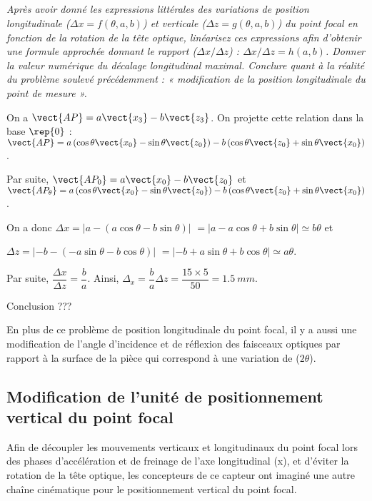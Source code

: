 \subparagraph{\label{q_15}}\textit{
Après avoir donné les expressions littérales des variations de position longitudinale ($\Delta x = f(\theta, a, b)$)
et verticale ($\Delta z = g(\theta, a, b)$) du point focal en fonction de la rotation de la tête optique, linéarisez ces
expressions afin d’obtenir une formule approchée donnant le rapport ($\Delta x / \Delta z$) : $\Delta x / \Delta z = h(a, b)$.
Donner la valeur numérique du décalage longitudinal maximal.
Conclure quant à la réalité du problème soulevé précédemment : « modification de la position
longitudinale du point de mesure ».}
\ifprof
\begin{corrige}
On a $\vect{AP} = a\vect{x_3}-b\vect{z_3}$. On projette cette relation dans la base $\rep{0}$ : 
 $\vect{AP} = a\left(\cos\theta \vect{x_0} - \sin\theta \vect{z_0}  \right) -b\left(\cos\theta \vect{z_0} + \sin\theta \vect{x_0}  \right)$.
 
 Par suite, 
 $\vect{AP_0} = a\vect{x_0}  -b\vect{z_0} $ et 
  $\vect{AP_{\theta}} = a\left(\cos\theta \vect{x_0} - \sin\theta \vect{z_0}  \right) -b\left(\cos\theta \vect{z_0} + \sin\theta \vect{x_0}  \right)$.

On a donc 
$\Delta x =  \left| a - \left(a\cos\theta   -b \sin\theta \right)\right|$ $=  \left| a - a\cos\theta +b \sin\theta \right| \simeq b\theta$ et

$\Delta z =  \left| -b - \left(-a\sin\theta -b\cos\theta \right)\right|$ $=  \left| -b +a\sin\theta +b\cos\theta \right|\simeq a\theta$.

Par suite, $\dfrac{\Delta x}{\Delta z} = \dfrac{b}{a}$. Ainsi, $\Delta_x = \dfrac{b}{a} \Delta z = \dfrac{15\times 5}{50}=\SI{1,5}{mm}$.

Conclusion ???
\end{corrige}
\else
\fi

\ifprof
\else
En plus de ce problème de position longitudinale du point focal, il y a aussi une modification de l’angle
d’incidence et de réflexion des faisceaux optiques par rapport à la surface de la pièce qui correspond à une
variation de ($2\theta$).
\fi

\subsection{Modification de l'unité de positionnement vertical du point focal}

\ifprof
\else
Afin de découpler les mouvements verticaux et longitudinaux du point focal lors des phases d’accélération
et de freinage de l’axe longitudinal (x), et d’éviter la rotation de la tête optique, les concepteurs de ce
capteur ont imaginé une autre chaîne cinématique pour le positionnement vertical du point focal.

